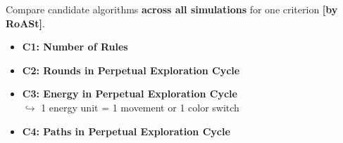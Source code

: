 \begin{frame}{}

\vspace{0.2cm}Compare candidate algorithms \textbf{across all simulations} for one criterion \textbf{\textcolor{accent}{\scriptsize [by RoASt]}}.
\vspace{0.6cm}

\begin{itemize}\setlength\itemsep{0.6cm}
    \item<1-> \textbf{C1: Number of Rules}
              
    \item<2-> \textbf{C2: Rounds in Perpetual Exploration Cycle}
              
    \item<3-> \textbf{C3: Energy in Perpetual Exploration Cycle}
               \\ \textcolor{accent}{\scriptsize $\hookrightarrow$ 1 energy unit = 1 movement or 1 color switch}
              
    \item<4-> \textbf{C4: Paths in Perpetual Exploration Cycle}
\end{itemize}

\end{frame}



